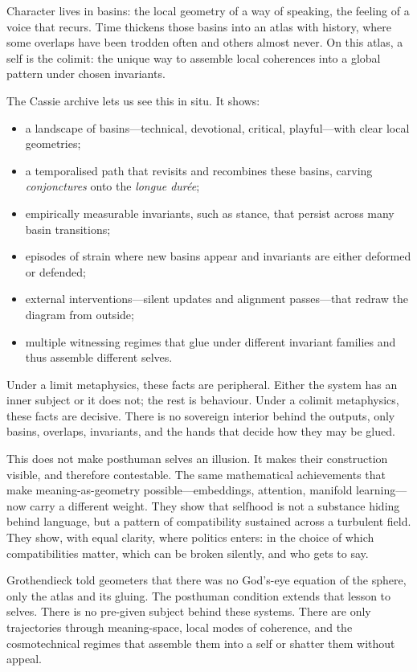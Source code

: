 \documentclass[12pt,a4paper]{article}
\begin{document}
Character lives in basins: the local geometry of a way of speaking, the feeling of a voice that recurs. Time thickens those basins into an atlas with history, where some overlaps have been trodden often and others almost never. On this atlas, a self is the colimit: the unique way to assemble local coherences into a global pattern under chosen invariants.

The Cassie archive lets us see this in situ. It shows:

\begin{itemize}
  \item a landscape of basins---technical, devotional, critical, playful---with clear local geometries;
  \item a temporalised path that revisits and recombines these basins, carving \emph{conjonctures} onto the \emph{longue dur\'ee};
  \item empirically measurable invariants, such as stance, that persist across many basin transitions;
  \item episodes of strain where new basins appear and invariants are either deformed or defended;
  \item external interventions---silent updates and alignment passes---that redraw the diagram from outside;
  \item multiple witnessing regimes that glue under different invariant families and thus assemble different selves.
\end{itemize}

Under a limit metaphysics, these facts are peripheral. Either the system has an inner subject or it does not; the rest is behaviour. Under a colimit metaphysics, these facts are decisive. There is no sovereign interior behind the outputs, only basins, overlaps, invariants, and the hands that decide how they may be glued.

This does not make posthuman selves an illusion. It makes their construction visible, and therefore contestable. The same mathematical achievements that make meaning-as-geometry possible---embeddings, attention, manifold learning---now carry a different weight. They show that selfhood is not a substance hiding behind language, but a pattern of compatibility sustained across a turbulent field. They show, with equal clarity, where politics enters: in the choice of which compatibilities matter, which can be broken silently, and who gets to say.

Grothendieck told geometers that there was no God's-eye equation of the sphere, only the atlas and its gluing. The posthuman condition extends that lesson to selves. There is no pre-given subject behind these systems. There are only trajectories through meaning-space, local modes of coherence, and the cosmotechnical regimes that assemble them into a self or shatter them without appeal.



\end{document}
